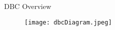\begin{frame}{DBC Overview}
\begin{figure}
\centering
\texttt{[image: dbcDiagram.jpeg]}
\end{figure}

\end{frame}


